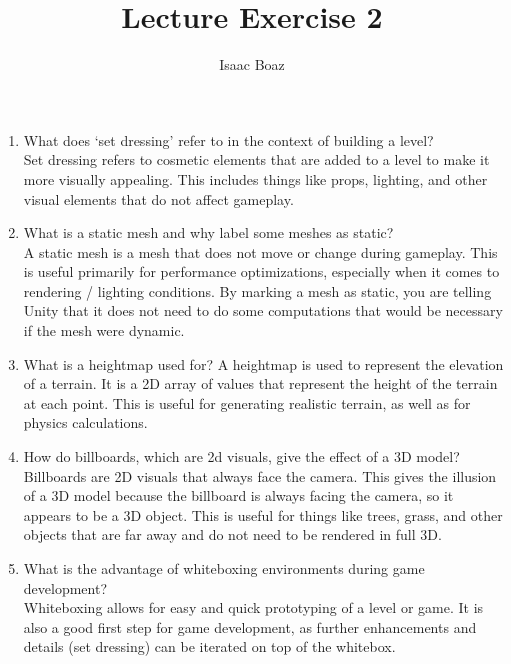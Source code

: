 \documentclass{article}
\title{Lecture Exercise 2}
\author{Isaac Boaz}
\begin{document}
\maketitle

\begin{enumerate}
    \item What does `set dressing' refer to in the context of building a level? \\
          Set dressing refers to cosmetic elements that are added to a level to
          make it more visually appealing. This includes things like props,
          lighting, and other visual elements that do not affect gameplay.
    \item What is a static mesh and why label some meshes as static? \\
          A static mesh is a mesh that does not move or change during gameplay.
          This is useful primarily for performance optimizations, especially
          when it comes to rendering / lighting conditions.
          By marking a mesh as static, you are telling Unity that it does not
          need to do some computations that would be necessary if the mesh were
          dynamic.
    \item What is a heightmap used for?
          A heightmap is used to represent the elevation of a terrain. It is a
          2D array of values that represent the height of the terrain at each
          point. This is useful for generating realistic terrain, as well as
          for physics calculations.
    \item How do billboards, which are 2d visuals, give the effect of a 3D
          model? \\
          Billboards are 2D visuals that always face the camera. This
          gives the illusion of a 3D model because the billboard is always
          facing the camera, so it appears to be a 3D object. This is useful
          for things like trees, grass, and other objects that are far away
          and do not need to be rendered in full 3D.
    \item What is the advantage of whiteboxing environments during game
          development? \\
          Whiteboxing allows for easy and quick prototyping of a level or
          game. It is also a good first step for game development, as further
          enhancements and details (set dressing) can be iterated on top of the
          whitebox.
\end{enumerate}
\end{document}
